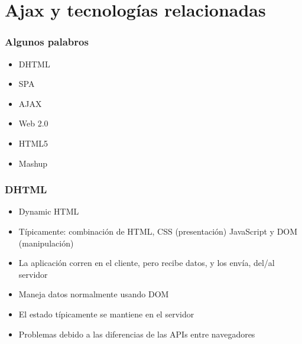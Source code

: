 
\section{Ajax y tecnologías relacionadas}


\begin{frame}
\frametitle{Algunos palabros}

{\Large
\begin{itemize}
\item DHTML
\item SPA
\item AJAX
\item Web 2.0
\item HTML5
\item Mashup
\end{itemize}
}
\end{frame}



\begin{frame}
\frametitle{DHTML}

{\Large
\begin{itemize}
\item Dynamic HTML
\item Típicamente: combinación de HTML, CSS (presentación)
  JavaScript y DOM (manipulación) 
\item La aplicación corren en el cliente, pero recibe datos, y los
  envía, del/al servidor
\item Maneja datos normalmente usando DOM
\item El estado típicamente se mantiene en el servidor
\item Problemas debido a las diferencias de las APIs entre navegadores
\end{itemize}
}

\end{frame}


